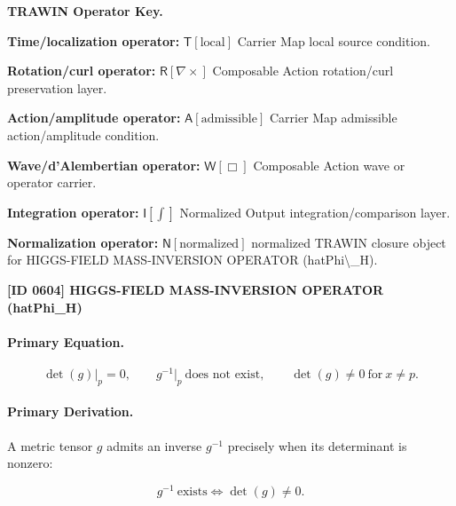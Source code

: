 \par\vspace{0.45\baselineskip}
\noindent\begin{minipage}[t]{\linewidth}
\begingroup
\small
\raggedright
\textbf{TRAWIN Operator Key.}\par
\noindent\textbf{Time/localization operator:} $\mathsf{T}\!\left[\mathrm{local}\right]$ Carrier Map local source condition.\par
\noindent\textbf{Rotation/curl operator:} $\mathsf{R}\!\left[\nabla\times\right]$ Composable Action rotation/curl preservation layer.\par
\noindent\textbf{Action/amplitude operator:} $\mathsf{A}\!\left[\mathrm{admissible}\right]$ Carrier Map admissible action/amplitude condition.\par
\noindent\textbf{Wave/d'Alembertian operator:} $\mathsf{W}\!\left[\Box\right]$ Composable Action wave or operator carrier.\par
\noindent\textbf{Integration operator:} $\mathsf{I}\!\left[\int\right]$ Normalized Output integration/comparison layer.\par
\noindent\textbf{Normalization operator:} $\mathsf{N}\!\left[\mathrm{normalized}\right]$ normalized TRAWIN closure object for HIGGS-FIELD MASS-INVERSION OPERATOR (hatPhi\textbackslash{}\_H).\par
\endgroup
\end{minipage}

\clearpage
\noindent\textbf{[ID 0604] HIGGS-FIELD MASS-INVERSION OPERATOR (hatPhi\_H)}\par
\vspace{0.35em}
\paragraph{Primary Equation.}
\begin{equation}
\det(g)\big|_{p}=0,
\qquad
g^{-1}\big|_{p}\ \text{does not exist},
\qquad
\det(g)\neq 0\ \text{for}\ x\neq p .
\end{equation}

\paragraph{Primary Derivation.}
A metric tensor $g$ admits an inverse $g^{-1}$ precisely when its determinant is nonzero:

\begin{equation}
g^{-1}\ \text{exists}
\iff
\det(g)\neq 0 .
\end{equation}

